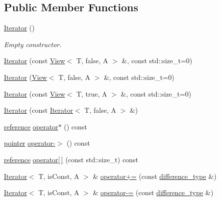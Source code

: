 \subsection*{Public Member Functions}
\begin{DoxyCompactItemize}
\item 
\hyperlink{classandres_1_1Iterator_a6a97994e2999c992ed829b3da6c748bf}{Iterator} ()
\begin{DoxyCompactList}\small\item\em Empty constructor. \end{DoxyCompactList}\item 
\hyperlink{classandres_1_1Iterator_a7b3a9873e6c06df90bd70a0262c90de1}{Iterator} (const \hyperlink{classandres_1_1View}{View}$<$ T, false, A $>$ \&, const std\+::size\+\_\+t=0)
\item 
\hyperlink{classandres_1_1Iterator_a182a2080c203da0d9a92045e12c0ac9d}{Iterator} (\hyperlink{classandres_1_1View}{View}$<$ T, false, A $>$ \&, const std\+::size\+\_\+t=0)
\item 
\hyperlink{classandres_1_1Iterator_aba0cdb5062a14318d9c45c6c71646285}{Iterator} (const \hyperlink{classandres_1_1View}{View}$<$ T, true, A $>$ \&, const std\+::size\+\_\+t=0)
\item 
\hyperlink{classandres_1_1Iterator_a6c650c1a0c2ae10324cb33cb22336172}{Iterator} (const \hyperlink{classandres_1_1Iterator}{Iterator}$<$ T, false, A $>$ \&)
\item 
\hyperlink{classandres_1_1Iterator_a9805f26813688f04c33e798f7999e5f7}{reference} \hyperlink{classandres_1_1Iterator_a2ea1f1bf8a9d61241f6ab9e68d051663}{operator$\ast$} () const 
\item 
\hyperlink{classandres_1_1Iterator_adf2ba3f1a3cc9c98bff9c544afdb22f9}{pointer} \hyperlink{classandres_1_1Iterator_a41397c945f86104d4553e264f360862b}{operator-\/$>$} () const 
\item 
\hyperlink{classandres_1_1Iterator_a9805f26813688f04c33e798f7999e5f7}{reference} \hyperlink{classandres_1_1Iterator_a3dda3a1f02423997143ed405766ed26d}{operator\mbox{[}$\,$\mbox{]}} (const std\+::size\+\_\+t) const 
\item 
\hyperlink{classandres_1_1Iterator}{Iterator}$<$ T, is\+Const, A $>$ \& \hyperlink{classandres_1_1Iterator_ad35d9bf0e2f5079c444353292f5def0c}{operator+=} (const \hyperlink{classandres_1_1Iterator_a10f8053d87b6b597d9fe011f66a240ca}{difference\+\_\+type} \&)
\item 
\hyperlink{classandres_1_1Iterator}{Iterator}$<$ T, is\+Const, A $>$ \& \hyperlink{classandres_1_1Iterator_a2d9d6f6b6b9c3e1843f00b3162f9dfeb}{operator-\/=} (const \hyperlink{classandres_1_1Iterator_a10f8053d87b6b597d9fe011f66a240ca}{difference\+\_\+type} \&)

\end{DoxyCompactItemize}
